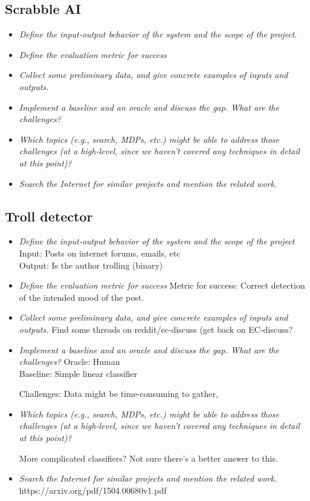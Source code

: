 \documentclass[12pt]{article}
\begin{document}
\subsection{Scrabble AI}
\begin{itemize}
  \item  \emph{Define the input-output behavior of the system and the scope of the project}.
  \item  \emph{Define the evaluation metric for success}
  \item  \emph{Collect some preliminary data, and give concrete examples of inputs and outputs.}
  \item  \emph{Implement a baseline and an oracle and discuss the gap. What are the challenges?}
  \item \emph{Which topics (e.g., search, MDPs, etc.) might be able to address those challenges (at a high-level, since we haven't covered any techniques in detail at this point)?}
  \item  \emph{Search the Internet for similar projects and mention the related work.}
\end{itemize}

\subsection{Troll detector}
\begin{itemize} 
\item  \emph{Define the input-output behavior of the system and the scope of the project}
	Input: Posts on internet forums, emails, etc \\ 
	Output: Is the author trolling (binary) 
  
\item  \emph{Define the evaluation metric for success}
	Metric for success: Correct detection of the intended mood of the post. 

  \item  \emph{Collect some preliminary data, and give concrete examples of inputs and outputs.}
	Find some threads on reddit/ec-discuss (get back on EC-discuss?

  \item  \emph{Implement a baseline and an oracle and discuss the gap. What are the challenges?}
	Oracle: Human \\
	Baseline: Simple linear classifier

	Challenges: Data might be time-consuming to gather, 

  \item \emph{Which topics (e.g., search, MDPs, etc.) might be able to address those challenges (at a high-level, since we haven't covered any techniques in detail at this point)?}

	More complicated classifiers? Not sure there's a better answer to this. 
  \item  \emph{Search the Internet for similar projects and mention the related work.}
	https://arxiv.org/pdf/1504.00680v1.pdf
\end{itemize}
\end{document}
